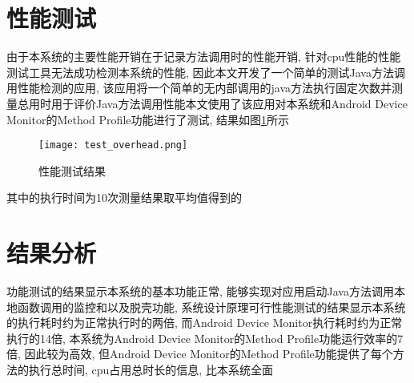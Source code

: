 \section{性能测试}
由于本系统的主要性能开销在于记录方法调用时的性能开销, 针对cpu性能的性能测试工具无法成功检测本系统的性能, 因此本文开发了一个简单的测试Java方法调用性能检测的应用, 该应用将一个简单的无内部调用的java方法执行固定次数并测量总用时用于评价Java方法调用性能\juhao 本文使用了该应用对本系统和Android Device Monitor的Method Profile功能进行了测试, 结果如图\ref{testOverhead}所示\juhao 
\begin{figure}[ht]
	\centering
	\texttt{[image: test\_overhead.png]}
	\caption{性能测试结果}
	\label{testOverhead}
\end{figure}
其中的执行时间为10次测量结果取平均值得到的\juhao

\section{结果分析}
功能测试的结果显示本系统的基本功能正常, 能够实现对应用启动\dunhao Java方法调用\dunhao 本地函数调用的监控和以及脱壳功能, 系统设计原理可行\juhao 性能测试的结果显示本系统的执行耗时约为正常执行时的两倍, 而Android Device Monitor执行耗时约为正常执行的14倍, 本系统为Android Device Monitor的Method Profile功能运行效率的7倍, 因此较为高效, 但Android Device Monitor的Method Profile功能提供了每个方法的执行总时间, cpu占用总时长的信息, 比本系统全面\juhao 

